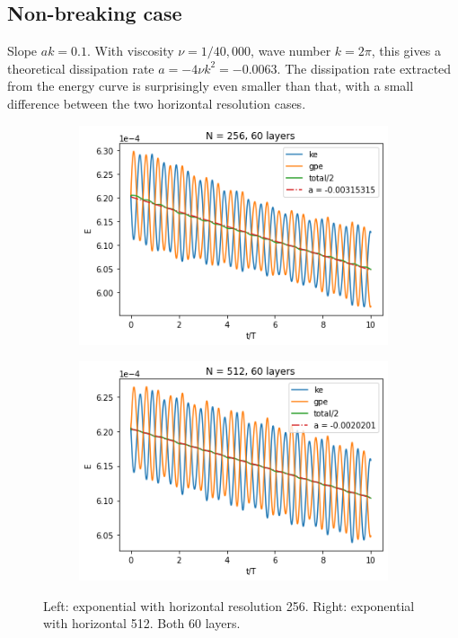 \documentclass{article}
\begin{document}
\subsection{Non-breaking case}
Slope $ak = 0.1$. With viscosity $\nu = 1/40,000$, wave number $k = 2\pi$, this gives a theoretical dissipation rate $a = -4\nu k^2 = -0.0063$. The dissipation rate extracted from the energy curve is surprisingly even smaller than that, with a small difference between the two horizontal resolution cases.
\begin{figure}[H]
    \begin{subfigure}{0.5\linewidth}
    \includegraphics[width=\linewidth]{figures/stokes_ak01_256.png} 
    \end{subfigure}
    \begin{subfigure}{0.5\linewidth}
    \includegraphics[width=\linewidth]{figures/stokes_ak01_512.png}
    \end{subfigure}
    \caption{Left: exponential with horizontal resolution 256. Right: exponential with horizontal 512. Both 60 layers.}
    \label{fig:fig1}
\end{figure}
\end{document}
